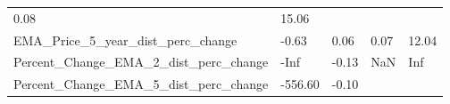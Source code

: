 \documentclass[]{article}
\begin{document}
\begin{longtable}[]{@{}lllll@{}}
\begin{minipage}[t]{0.09\columnwidth}
0.08\strut
\end{minipage} & \begin{minipage}[t]{0.11\columnwidth}\raggedright\strut
15.06\strut
\end{minipage}\tabularnewline
\begin{minipage}[t]{0.49\columnwidth}\raggedright\strut
EMA\_Price\_5\_year\_dist\_perc\_change\strut
\end{minipage} & \begin{minipage}[t]{0.08\columnwidth}\raggedright\strut
-0.63\strut
\end{minipage} & \begin{minipage}[t]{0.09\columnwidth}\raggedright\strut
0.06\strut
\end{minipage} & \begin{minipage}[t]{0.09\columnwidth}\raggedright\strut
0.07\strut
\end{minipage} & \begin{minipage}[t]{0.11\columnwidth}\raggedright\strut
12.04\strut
\end{minipage}\tabularnewline
\begin{minipage}[t]{0.49\columnwidth}\raggedright\strut
Percent\_Change\_EMA\_2\_dist\_perc\_change\strut
\end{minipage} & \begin{minipage}[t]{0.08\columnwidth}\raggedright\strut
-Inf\strut
\end{minipage} & \begin{minipage}[t]{0.09\columnwidth}\raggedright\strut
-0.13\strut
\end{minipage} & \begin{minipage}[t]{0.09\columnwidth}\raggedright\strut
NaN\strut
\end{minipage} & \begin{minipage}[t]{0.11\columnwidth}\raggedright\strut
Inf\strut
\end{minipage}\tabularnewline
\begin{minipage}[t]{0.49\columnwidth}\raggedright\strut
Percent\_Change\_EMA\_5\_dist\_perc\_change\strut
\end{minipage} & \begin{minipage}[t]{0.08\columnwidth}\raggedright\strut
-556.60\strut
\end{minipage} & \begin{minipage}[t]{0.09\columnwidth}\raggedright\strut
-0.10\strut
\end{minipage} & \begin{minipage}[t]{0.09\columnwidth}\raggedright\strut

\end{minipage}
\end{longtable}
\end{document}
